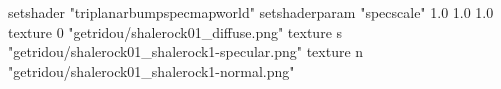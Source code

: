 setshader "triplanarbumpspecmapworld"
setshaderparam "specscale" 1.0 1.0 1.0
texture 0 "getridou/shalerock01_diffuse.png"
texture s "getridou/shalerock01_shalerock1-specular.png"
texture n "getridou/shalerock01_shalerock1-normal.png"
